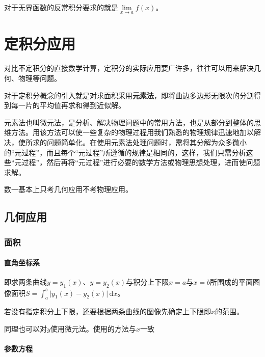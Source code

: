 \documentclass[UTF8, 12pt]{ctexart}
\begin{document}
对于无界函数的反常积分要求的就是$\lim\limits_{x\to a}f(x)$。


\section{定积分应用}

对比不定积分的直接数学计算，定积分的实际应用要广许多，往往可以用来解决几何、物理等问题。

对于定积分概念的引入就是对求面积采用\textbf{元素法}，即将曲边多边形无限次的分割得到每一片的平均值再求和得到近似解。

元素法也叫微元法，是分析、解决物理问题中的常用方法，也是从部分到整体的思维方法。用该方法可以使一些复杂的物理过程用我们熟悉的物理规律迅速地加以解决，使所求的问题简单化。在使用元素法处理问题时，需将其分解为众多微小的“元过程”，而且每个“元过程”所遵循的规律是相同的，这样，我们只需分析这些“元过程”，然后再将“元过程”进行必要的数学方法或物理思想处理，进而使问题求解。

数一基本上只考几何应用不考物理应用。

\subsection{几何应用}

\subsubsection{面积}

\paragraph{直角坐标系} \leavevmode \medskip

即求两条曲线$y=y_1(x)$、$y=y_2(x)$与积分上下限$x=a$与$x=b$所围成的平面图像面积$S=\int_a^b\vert y_1(x)-y_2(x)\vert\,\textrm{d}x$。

若没有指定积分上下限，还要根据两条曲线的图像先确定上下限即$x$的范围。

同理也可以对$y$使用微元法。使用的方法与$x$一致

\paragraph{参数方程} \leavevmode \medskip
\end{document}
